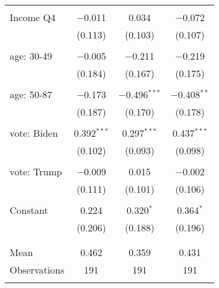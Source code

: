 \begin{tabular}{@{\extracolsep{5pt}}lccc}
  & & & \\ 
 Income Q4 & $-$0.011 & 0.034 & $-$0.072 \\ 
  & (0.113) & (0.103) & (0.107) \\ 
  & & & \\ 
 age: 30-49 & $-$0.005 & $-$0.211 & $-$0.219 \\ 
  & (0.184) & (0.167) & (0.175) \\ 
  & & & \\ 
 age: 50-87 & $-$0.173 & $-$0.496$^{***}$ & $-$0.408$^{**}$ \\ 
  & (0.187) & (0.170) & (0.178) \\ 
  & & & \\ 
 vote: Biden & 0.392$^{***}$ & 0.297$^{***}$ & 0.437$^{***}$ \\ 
  & (0.102) & (0.093) & (0.098) \\ 
  & & & \\ 
 vote: Trump & $-$0.009 & 0.015 & $-$0.002 \\ 
  & (0.111) & (0.101) & (0.106) \\ 
  & & & \\ 
 Constant & 0.224 & 0.320$^{*}$ & 0.364$^{*}$ \\ 
  & (0.206) & (0.188) & (0.196) \\ 
  & & & \\ 
\hline \\[-1.8ex] 
Mean & 0.462 & 0.359 & 0.431 \\ 
Observations & 191 & 191 & 191 \\ 
\hline 
\hline \\[-1.8ex] 
\end{tabular} 

